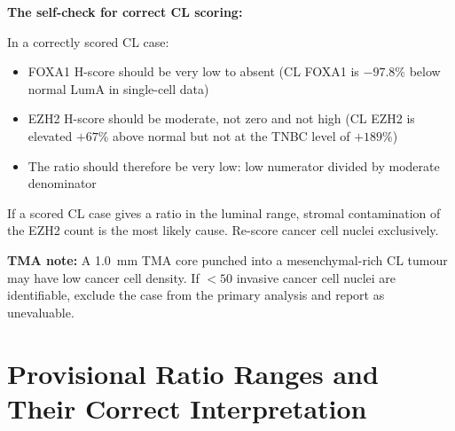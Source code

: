 \documentclass[11pt, a4paper]{article}
\begin{document}
\begin{mdframed}[backgroundcolor=criticalbox,
                 linecolor=red!70!black,
                 linewidth=2pt]
\bigskip
\textbf{The self-check for correct CL scoring:}

In a correctly scored CL case:
\begin{itemize}[noitemsep]
    \item FOXA1 H-score should be very low
    to absent (CL FOXA1 is $-97.8\%$ below
    normal LumA in single-cell data)
    \item EZH2 H-score should be moderate,
    not zero and not high (CL EZH2 is
    elevated $+67\%$ above normal but not
    at the TNBC level of $+189\%$)
    \item The ratio should therefore be
    very low: low numerator divided by
    moderate denominator
\end{itemize}

If a scored CL case gives a ratio in the
luminal range, stromal contamination of the
EZH2 count is the most likely cause.
Re-score cancer cell nuclei exclusively.

\bigskip
\textbf{TMA note:} A 1.0~mm TMA core punched
into a mesenchymal-rich CL tumour may have
low cancer cell density. If $<50$ invasive
cancer cell nuclei are identifiable, exclude
the case from the primary analysis and report
as unevaluable.
\end{mdframed}

\section{Provisional Ratio Ranges and Their
Correct Interpretation}
\label{sec:cutpoints}
\end{document}
